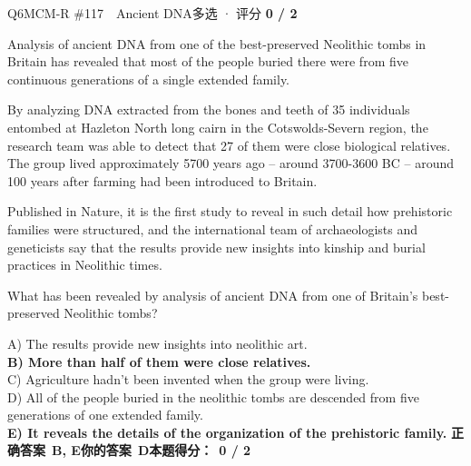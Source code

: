 \begin{qblock}{Q6\quad MCM-R \#117\ \ Ancient DNA}{多选 · 评分 \textcolor{cAccent}{\bfseries 0 / 2}}
\begin{promptbox}
Analysis of ancient DNA from one of the best-preserved Neolithic tombs in Britain has revealed that most of the people buried there were from five continuous generations of a single extended family.

By analyzing DNA extracted from the bones and teeth of 35 individuals entombed at Hazleton North long cairn in the Cotswolds-Severn region, the research team was able to detect that 27 of them were close biological relatives. The group lived approximately 5700 years ago -- around 3700-3600 BC -- around 100 years after farming had been introduced to Britain.

Published in Nature, it is the first study to reveal in such detail how prehistoric families were structured, and the international team of archaeologists and geneticists say that the results provide new insights into kinship and burial practices in Neolithic times.
\end{promptbox}
\begin{notebox}What has been revealed by analysis of ancient DNA from one of Britain's best-preserved Neolithic tombs?\end{notebox}
{\small
A) The results provide new insights into neolithic art.\\
{\color{cFix}\textbf{B) More than half of them were close relatives.}}\\
C) Agriculture hadn't been invented when the group were living.\\
D) All of the people buried in the neolithic tombs are descended from five generations of one extended family.\\
{\color{cFix}\textbf{E) It reveals the details of the organization of the prehistoric family.}}}
\smallskip
\textbf{正确答案}\ \textcolor{cFix}{\bfseries B, E}\qquad\textbf{你的答案}\ {\color{cWrong}\bfseries D}\qquad\textbf{本题得分：}\ {\color{cAccent}\bfseries 0 / 2}
\end{qblock}

